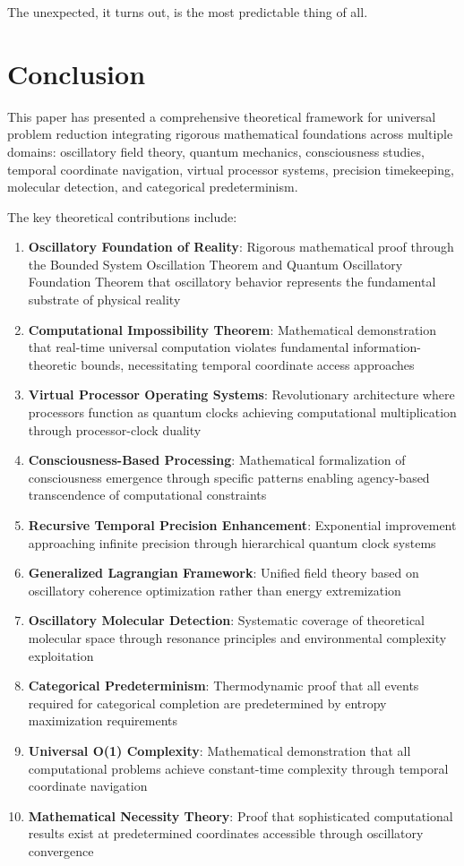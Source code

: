 \documentclass[12pt,a4paper]{article}
\theoremstyle{definition}
\begin{document}
{The unexpected, it turns out, is the most predictable thing of all.

\section{Conclusion}

This paper has presented a comprehensive theoretical framework for universal problem reduction integrating rigorous mathematical foundations across multiple domains: oscillatory field theory, quantum mechanics, consciousness studies, temporal coordinate navigation, virtual processor systems, precision timekeeping, molecular detection, and categorical predeterminism.

The key theoretical contributions include:

\begin{enumerate}
\item \textbf{Oscillatory Foundation of Reality}: Rigorous mathematical proof through the Bounded System Oscillation Theorem and Quantum Oscillatory Foundation Theorem that oscillatory behavior represents the fundamental substrate of physical reality
\item \textbf{Computational Impossibility Theorem}: Mathematical demonstration that real-time universal computation violates fundamental information-theoretic bounds, necessitating temporal coordinate access approaches
\item \textbf{Virtual Processor Operating Systems}: Revolutionary architecture where processors function as quantum clocks achieving computational multiplication through processor-clock duality
\item \textbf{Consciousness-Based Processing}: Mathematical formalization of consciousness emergence through specific patterns enabling agency-based transcendence of computational constraints
\item \textbf{Recursive Temporal Precision Enhancement}: Exponential improvement approaching infinite precision through hierarchical quantum clock systems
\item \textbf{Generalized Lagrangian Framework}: Unified field theory based on oscillatory coherence optimization rather than energy extremization
\item \textbf{Oscillatory Molecular Detection}: Systematic coverage of theoretical molecular space through resonance principles and environmental complexity exploitation
\item \textbf{Categorical Predeterminism}: Thermodynamic proof that all events required for categorical completion are predetermined by entropy maximization requirements
\item \textbf{Universal O(1) Complexity}: Mathematical demonstration that all computational problems achieve constant-time complexity through temporal coordinate navigation
\item \textbf{Mathematical Necessity Theory}: Proof that sophisticated computational results exist at predetermined coordinates accessible through oscillatory convergence
\end{enumerate}

}
\end{document}
